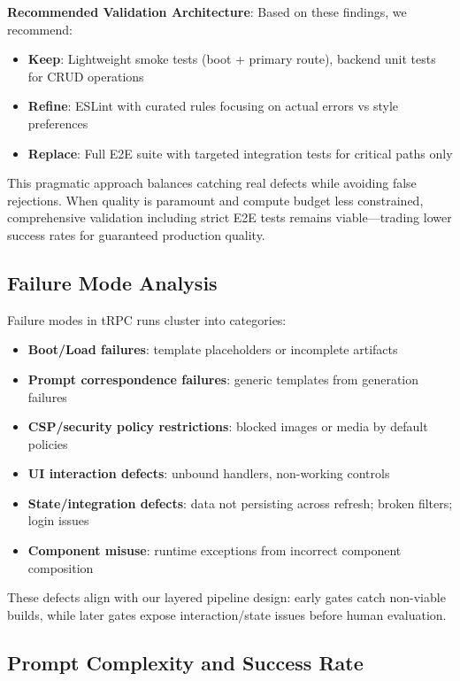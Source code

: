 \documentclass{article}
\begin{document}
\textbf{Recommended Validation Architecture}:
Based on these findings, we recommend:
\begin{itemize}
\item \textbf{Keep}: Lightweight smoke tests (boot + primary route), backend unit tests for CRUD operations
\item \textbf{Refine}: ESLint with curated rules focusing on actual errors vs style preferences
\item \textbf{Replace}: Full E2E suite with targeted integration tests for critical paths only
\end{itemize}

This pragmatic approach balances catching real defects while avoiding false rejections. When quality is paramount and compute budget less constrained, comprehensive validation including strict E2E tests remains viable—trading lower success rates for guaranteed production quality.

\subsection{Failure Mode Analysis}

Failure modes in tRPC runs cluster into categories:

\begin{itemize}
\item \textbf{Boot/Load failures}: template placeholders or incomplete artifacts
\item \textbf{Prompt correspondence failures}: generic templates from generation failures
\item \textbf{CSP/security policy restrictions}: blocked images or media by default policies
\item \textbf{UI interaction defects}: unbound handlers, non-working controls
\item \textbf{State/integration defects}: data not persisting across refresh; broken filters; login issues
\item \textbf{Component misuse}: runtime exceptions from incorrect component composition
\end{itemize}

These defects align with our layered pipeline design: early gates catch non-viable builds, while later gates expose interaction/state issues before human evaluation.

\subsection{Prompt Complexity and Success Rate}
\label{sec:prompt-complexity}
\end{document}
